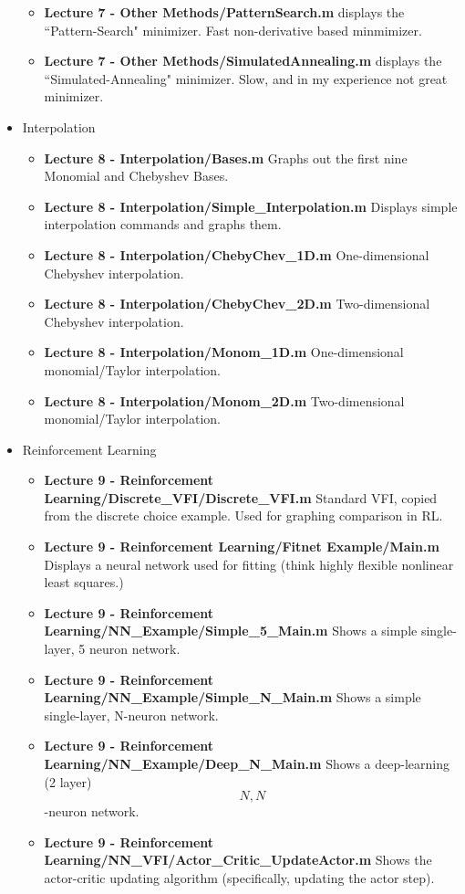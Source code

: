 \documentclass[a4paper]{article}
\begin{document}
\begin{itemize}
\begin{itemize}
\item \textbf{Lecture 7 - Other Methods/PatternSearch.m}  displays the ``Pattern-Search" minimizer.  Fast non-derivative based minmimizer.
\item \textbf{Lecture 7 - Other Methods/SimulatedAnnealing.m} displays the ``Simulated-Annealing" minimizer.  Slow, and in my experience not great minimizer.
\end{itemize}
\item Interpolation
\begin{itemize}
\item \textbf{Lecture 8 - Interpolation/Bases.m} Graphs out the first nine Monomial and Chebyshev Bases.
\item \textbf{Lecture 8 - Interpolation/Simple\_Interpolation.m} Displays simple interpolation commands and graphs them.
\item \textbf{Lecture 8 - Interpolation/ChebyChev\_1D.m} One-dimensional Chebyshev interpolation.
\item \textbf{Lecture 8 - Interpolation/ChebyChev\_2D.m} Two-dimensional Chebyshev interpolation.
\item \textbf{Lecture 8 - Interpolation/Monom\_1D.m} One-dimensional monomial/Taylor interpolation.
\item \textbf{Lecture 8 - Interpolation/Monom\_2D.m} Two-dimensional monomial/Taylor interpolation.
\end{itemize}
\item Reinforcement Learning
\begin{itemize}
\item \textbf{Lecture 9 - Reinforcement Learning/Discrete\_VFI/Discrete\_VFI.m} Standard VFI, copied from the discrete choice example.  Used for graphing comparison in RL.
\item \textbf{Lecture 9 - Reinforcement Learning/Fitnet Example/Main.m} Displays a neural network used for fitting (think highly flexible nonlinear least squares.)
\item \textbf{Lecture 9 - Reinforcement Learning/NN\_Example/Simple\_5\_Main.m} Shows a simple single-layer, 5 neuron network.
\item \textbf{Lecture 9 - Reinforcement Learning/NN\_Example/Simple\_N\_Main.m} Shows a simple single-layer, N-neuron network.
\item \textbf{Lecture 9 - Reinforcement Learning/NN\_Example/Deep\_N\_Main.m} Shows a deep-learning (2 layer) \[N,N\]-neuron network.
\item \textbf{Lecture 9 - Reinforcement Learning/NN\_VFI/Actor\_Critic\_UpdateActor.m} Shows the actor-critic updating algorithm (specifically, updating the actor step).

\end{itemize}
\end{itemize}
\end{document}
